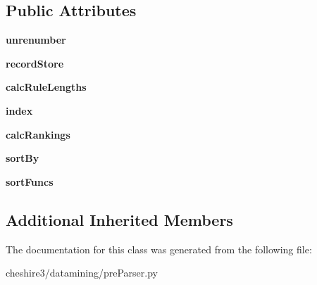 \subsection*{Public Attributes}
\begin{DoxyCompactItemize}
\item 
\hypertarget{classcheshire3_1_1datamining_1_1pre_parser_1_1_match_to_object_pre_parser_ad646e460e9ae7140f7839a3939752cda}{{\bfseries unrenumber}}\label{classcheshire3_1_1datamining_1_1pre_parser_1_1_match_to_object_pre_parser_ad646e460e9ae7140f7839a3939752cda}

\item 
\hypertarget{classcheshire3_1_1datamining_1_1pre_parser_1_1_match_to_object_pre_parser_a10e3ee0c9f48b683cd8ad19ff26f2539}{{\bfseries record\-Store}}\label{classcheshire3_1_1datamining_1_1pre_parser_1_1_match_to_object_pre_parser_a10e3ee0c9f48b683cd8ad19ff26f2539}

\item 
\hypertarget{classcheshire3_1_1datamining_1_1pre_parser_1_1_match_to_object_pre_parser_a63f7dc7338e7febbd951ff84c17e8adf}{{\bfseries calc\-Rule\-Lengths}}\label{classcheshire3_1_1datamining_1_1pre_parser_1_1_match_to_object_pre_parser_a63f7dc7338e7febbd951ff84c17e8adf}

\item 
\hypertarget{classcheshire3_1_1datamining_1_1pre_parser_1_1_match_to_object_pre_parser_af2058af7b70819ad55c023f117482b8f}{{\bfseries index}}\label{classcheshire3_1_1datamining_1_1pre_parser_1_1_match_to_object_pre_parser_af2058af7b70819ad55c023f117482b8f}

\item 
\hypertarget{classcheshire3_1_1datamining_1_1pre_parser_1_1_match_to_object_pre_parser_af2e8d8de694bb3bad443d7ea609a7540}{{\bfseries calc\-Rankings}}\label{classcheshire3_1_1datamining_1_1pre_parser_1_1_match_to_object_pre_parser_af2e8d8de694bb3bad443d7ea609a7540}

\item 
\hypertarget{classcheshire3_1_1datamining_1_1pre_parser_1_1_match_to_object_pre_parser_aa8a6131b1b94b21fc51d26d3baffe38c}{{\bfseries sort\-By}}\label{classcheshire3_1_1datamining_1_1pre_parser_1_1_match_to_object_pre_parser_aa8a6131b1b94b21fc51d26d3baffe38c}

\item 
\hypertarget{classcheshire3_1_1datamining_1_1pre_parser_1_1_match_to_object_pre_parser_aa1bb0eafce96c745414f472ae5d8d9fd}{{\bfseries sort\-Funcs}}\label{classcheshire3_1_1datamining_1_1pre_parser_1_1_match_to_object_pre_parser_aa1bb0eafce96c745414f472ae5d8d9fd}

\end{DoxyCompactItemize}
\subsection*{Additional Inherited Members}


The documentation for this class was generated from the following file\-:\begin{DoxyCompactItemize}
\item 
cheshire3/datamining/pre\-Parser.\-py\end{DoxyCompactItemize}
